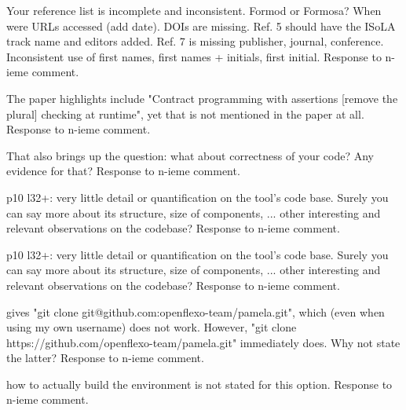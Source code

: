 \documentclass[10pt]{article}
\begin{document}
\begin{response}{Your reference list is incomplete and inconsistent. Formod or Formosa? When were URLs accessed (add date). DOIs are missing. Ref. 5 should have the ISoLA track name and editors added. Ref. 7 is missing publisher, journal, conference. Inconsistent use of first names, first names + initials, first initial.}
  Response to n-ieme comment.
\end{response}

\begin{response}{The paper highlights include "Contract programming with assertions [remove the plural] checking at runtime", yet that is not mentioned in the paper at all.
}
  Response to n-ieme comment.
\end{response}

\begin{response}{That also brings up the question: what about correctness of your code? Any evidence for that?}
  Response to n-ieme comment.
\end{response}

\begin{response}{p10 l32+: very little detail or quantification on the tool's code base. Surely you can say more about its structure, size of components, ... other interesting and relevant observations on the codebase?}
  Response to n-ieme comment.
\end{response}

\begin{response}{p10 l32+: very little detail or quantification on the tool's code base. Surely you can say more about its structure, size of components, ... other interesting and relevant observations on the codebase?}
  Response to n-ieme comment.
\end{response}


\begin{response}{gives "git clone git@github.com:openflexo-team/pamela.git", which (even when using my own username) does not work. However, "git clone https://github.com/openflexo-team/pamela.git" immediately does. Why not state the latter?
}
  Response to n-ieme comment.
\end{response}

\begin{response}{how to actually build the environment is not stated for this option.}
  Response to n-ieme comment.
\end{response}
\end{document}
